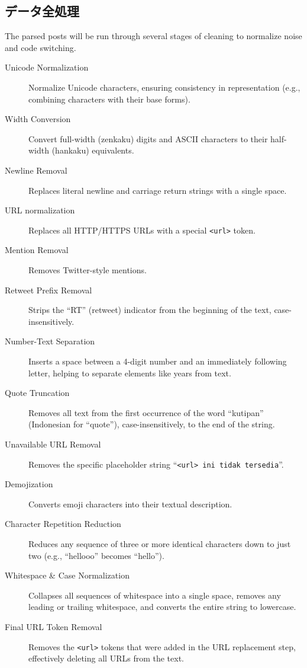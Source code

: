 \documentclass{jabstract}
\begin{document}
\begin{multicols}{2}
\subsection{データ全処理}
The parsed posts will be run through several stages of cleaning to normalize noise and code switching. 
\begin{description}
    \item[Unicode Normalization] Normalize Unicode characters, ensuring consistency in representation (e.g., combining characters with their base forms).
    \item[Width Conversion] Convert full-width (zenkaku) digits and ASCII characters to their half-width (hankaku) equivalents.
    \item[Newline Removal] Replaces literal newline and carriage return strings with a single space.
    \item[URL normalization] Replaces all HTTP/HTTPS URLs with a special \verb|<url>| token.
    \item[Mention Removal] Removes Twitter-style mentions.
    \item[Retweet Prefix Removal] Strips the ``RT'' (retweet) indicator from the beginning of the text, case-insensitively.
    \item[Number-Text Separation] Inserts a space between a 4-digit number and an immediately following letter, helping to separate elements like years from text.
    \item[Quote Truncation] Removes all text from the first occurrence of the word ``kutipan'' (Indonesian for ``quote''), case-insensitively, to the end of the string.
    \item[Unavailable URL Removal] Removes the specific placeholder string ``\verb|<url> ini tidak tersedia|''.
    \item[Demojization] Converts emoji characters into their textual description.
    \item[Character Repetition Reduction] Reduces any sequence of three or more identical characters down to just two (e.g., ``hellooo'' becomes ``hello'').
    \item[Whitespace \& Case Normalization] Collapses all sequences of whitespace into a single space, removes any leading or trailing whitespace, and converts the entire string to lowercase.
    \item[Final URL Token Removal] Removes the \verb|<url>| tokens that were added in the URL replacement step, effectively deleting all URLs from the text.
\end{description}


\end{multicols}
\end{document}

